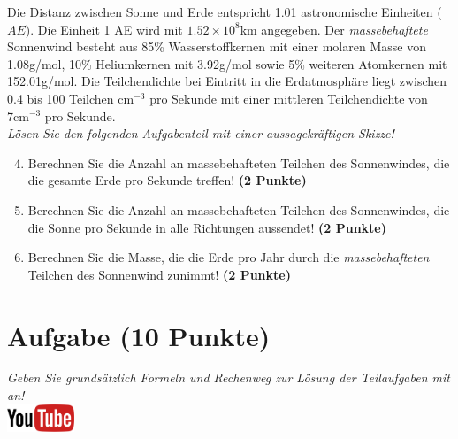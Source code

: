 \documentclass[a4paper, 9pt]{scrartcl}\usepackage[]{graphicx}\usepackage[]{xcolor}
\begin{document}
Die Distanz zwischen Sonne und Erde entspricht 1.01 astronomische Einheiten ($AE$). Die Einheit 1 AE wird mit \ensuremath{1.52\times 10^{8}}km angegeben. Der \textit{massebehaftete} Sonnenwind besteht aus 85\% Wasserstoffkernen mit einer molaren Masse von 1.08g/mol, 10\% Heliumkernen mit 3.92g/mol sowie 5\% weiteren Atomkernen mit  152.01g/mol. Die Teilchendichte bei Eintritt in die Erdatmosphäre liegt zwischen 0.4 bis 100 Teilchen cm$^{-3}$ pro Sekunde mit einer mittleren Teilchendichte von 7cm$^{-3}$ pro Sekunde. \\

\textit{Lösen Sie den folgenden Aufgabenteil mit einer aussagekräftigen Skizze!}

\begin{enumerate}
  \setcounter{enumi}{3}
\item Berechnen Sie die Anzahl an massebehafteten Teilchen des Sonnenwindes, die die gesamte Erde pro Sekunde treffen! \textbf{(2 Punkte)}
\item Berechnen Sie die Anzahl an massebehafteten Teilchen des Sonnenwindes, die die Sonne pro Sekunde in alle Richtungen aussendet! \textbf{(2 Punkte)}
\item Berechnen Sie die Masse, die die Erde pro Jahr durch die \textit{massebehafteten} Teilchen des Sonnenwind zunimmt! \textbf{(2 Punkte)}
\end{enumerate}


\clearpage

\section{Aufgabe \hfill (10 Punkte)}

\textit{Geben Sie grunds{\"a}tzlich Formeln und Rechenweg zur L{\"o}sung der
  Teilaufgaben mit an!} \\[1Ex]

\hfill\href{https://youtu.be/n451XnhtSh4}{\includegraphics[width = 2cm]{img/youtube}} %
\hspace{2Ex}
\end{document}

